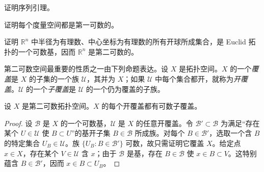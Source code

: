 \documentclass[../../main.tex]{subfiles}
\begin{document}
\begin{exercise}\label{exercise:appA-A-13}
证明序列引理。
\end{exercise}

\begin{exercise}\label{exercise:appA-A-14}
证明每个度量空间都是第一可数的。
\end{exercise}

\begin{exercise}\label{exercise:appA-A-15}
证明 $\mathbb R^n$ 中半径为有理数、中心坐标为有理数的所有开球所成集合，是 Euclid 拓扑的一个可数基，因而 $\mathbb R^n$ 是第二可数的。
\end{exercise}

第二可数空间最重要的性质之一由下列命题表达。设 $X$ 是拓扑空间。$X$ 的一个\emph{覆盖}是 $X$ 的子集的一个族 $\mathcal U$，其并为 $X$；如果 $\mathcal U$ 中每个集合都开，就称为\emph{开覆盖}。$\mathcal U$ 的一个\emph{子覆盖}是 $\mathcal U$ 的一个仍为覆盖的子族。

\begin{proposition}\label{proposition:appA-second-countable-subcover}
设 $X$ 是第二可数拓扑空间。$X$ 的每个开覆盖都有可数子覆盖。
\end{proposition}

\begin{proof}
设 $\mathcal B$ 是 $X$ 的一个可数基，$\mathcal U$ 是 $X$ 的任意开覆盖。令 $\mathcal B'\subset\mathcal B$ 为满足“存在某个 $U\in\mathcal U$ 使 $B\subset U$”的基开子集 $B\in\mathcal B$ 所成族。对每个 $B\in\mathcal B'$，选取一个含 $B$ 的特定集合 $U_B\in\mathcal U$。族 $\{U_B:B\in\mathcal B'\}$ 可数，故只需证明它覆盖 $X$。给定点 $x\in X$，存在某个 $V\in\mathcal U$ 含 $x$；由于 $\mathcal B$ 是基，存在 $B\in\mathcal B$ 使 $x\in B\subset V$。这特别蕴含 $B\in\mathcal B'$，因而 $x\in B\subset U_B$。
\end{proof}
\end{document}
